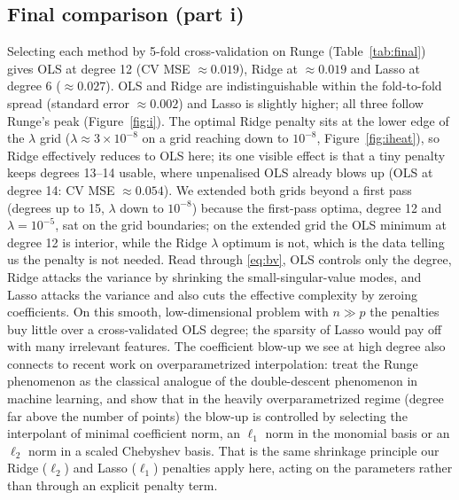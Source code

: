 \documentclass[a4paper,11pt]{article}
\begin{document}
\subsection{Final comparison (part i)}
Selecting each method by 5-fold cross-validation on Runge (Table~\ref{tab:final})
gives OLS at degree 12 (CV MSE $\approx 0.019$), Ridge at $\approx 0.019$ and
Lasso at degree 6 ($\approx 0.027$). OLS and Ridge are indistinguishable within
the fold-to-fold spread (standard error $\approx 0.002$) and Lasso is slightly
higher; all three follow Runge's peak (Figure~\ref{fig:i}). The optimal Ridge
penalty sits at the lower edge of the $\lambda$ grid ($\lambda\approx
3\times10^{-8}$ on a grid reaching down to $10^{-8}$, Figure~\ref{fig:iheat}),
so Ridge effectively reduces to OLS here; its one visible effect is that a tiny penalty keeps degrees
13--14 usable, where unpenalised OLS already blows up (OLS at degree 14: CV MSE
$\approx 0.054$). We extended both grids beyond a first pass (degrees up to 15,
$\lambda$ down to $10^{-8}$) because the first-pass optima, degree 12 and
$\lambda=10^{-5}$, sat on the grid boundaries; on the extended grid the OLS
minimum at degree 12 is interior, while the Ridge $\lambda$ optimum is not, which
is the data telling us the penalty is not needed. Read through \eqref{eq:bv},
OLS controls only the degree,
Ridge attacks the variance by shrinking the small-singular-value modes, and
Lasso attacks the variance and also cuts the effective complexity by zeroing
coefficients. On this smooth, low-dimensional problem with $n\gg p$ the
penalties buy little over a cross-validated OLS degree; the sparsity of Lasso
would pay off with many irrelevant features. The coefficient blow-up we see at
high degree also connects to recent work on overparametrized interpolation:
\cite{wein2026} treat the Runge phenomenon as the classical analogue of the
double-descent phenomenon in machine learning, and show that in the heavily
overparametrized regime (degree far above the number of points) the blow-up is
controlled by selecting the interpolant of minimal coefficient norm, an $\ell_1$
norm in the monomial basis or an $\ell_2$ norm in a scaled Chebyshev basis. That
is the same shrinkage principle our Ridge ($\ell_2$) and Lasso ($\ell_1$)
penalties apply here, acting on the parameters rather than through an explicit
penalty term.
\end{document}
